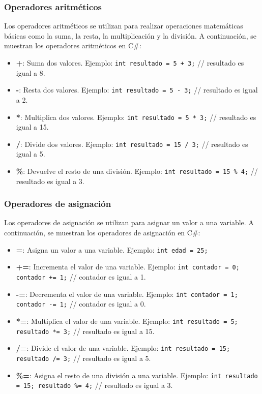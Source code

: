 \documentclass[executivepaper]{article}
\begin{document}
\subsubsection*{Operadores aritméticos}

Los operadores aritméticos se utilizan para realizar operaciones matemáticas básicas como la suma, la resta, la multiplicación y la división. A continuación, se muestran los operadores aritméticos en C\#:

\begin{itemize}
    \item \textbf{+}: Suma dos valores. Ejemplo: \texttt{int resultado = 5 + 3;} // resultado es igual a 8.
    \item \textbf{-}: Resta dos valores. Ejemplo: \texttt{int resultado = 5 - 3;} // resultado es igual a 2.
    \item \textbf{*}: Multiplica dos valores. Ejemplo: \texttt{int resultado = 5 * 3;} // resultado es igual a 15.
    \item \textbf{/}: Divide dos valores. Ejemplo: \texttt{int resultado = 15 / 3;} // resultado es igual a 5.
    \item \textbf{\%}: Devuelve el resto de una división. Ejemplo: \texttt{int resultado = 15 \% 4;} // resultado es igual a 3.
\end{itemize}

\subsubsection*{Operadores de asignación}

Los operadores de asignación se utilizan para asignar un valor a una variable. A continuación, se muestran los operadores de asignación en C\#:

\begin{itemize}
    \item \textbf{=}: Asigna un valor a una variable. Ejemplo: \texttt{int edad = 25;}
    \item \textbf{+=}: Incrementa el valor de una variable. Ejemplo: \texttt{int contador = 0; contador += 1;} // contador es igual a 1.
    \item \textbf{-=}: Decrementa el valor de una variable. Ejemplo: \texttt{int contador = 1; contador -= 1;} // contador es igual a 0.
    \item \textbf{*=}: Multiplica el valor de una variable. Ejemplo: \texttt{int resultado = 5; resultado *= 3;} // resultado es igual a 15.
    \item \textbf{/=}: Divide el valor de una variable. Ejemplo: \texttt{int resultado = 15; resultado /= 3;} // resultado es igual a 5.
    \item \textbf{\%=}: Asigna el resto de una división a una variable. Ejemplo: \texttt{int resultado = 15; resultado \%= 4;} // resultado es igual a 3.
    \end{itemize}
\end{document}
